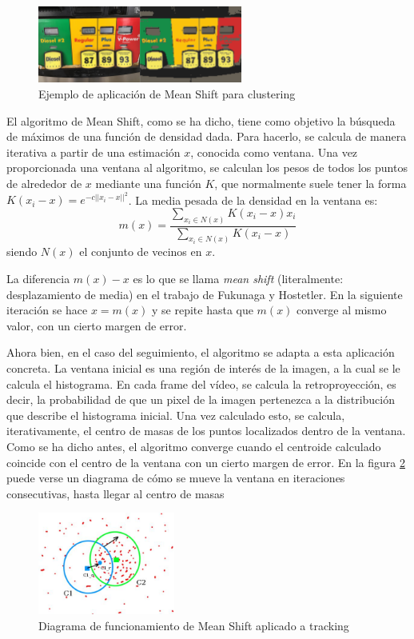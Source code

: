\begin{figure}
    \centering
    \includegraphics[width=0.6\textwidth]{images/clustering}
    \caption{Ejemplo de aplicación de Mean Shift para clustering}
    \label{fig:clustering}
\end{figure}

El algoritmo de Mean Shift, como se ha dicho, tiene como objetivo la búsqueda de máximos de una función de densidad dada. Para hacerlo, se calcula de manera iterativa a partir de una estimación $x$, conocida como ventana. Una vez proporcionada una ventana al algoritmo, se calculan los pesos de todos los puntos de alrededor de $x$ mediante una función $K$, que normalmente suele tener la forma $K(x_i-x) = e^{-c||x_i-x||^2}$. La media pesada de la densidad en la ventana es:
\[
  m(x) = \frac{\sum_{x_i\in N(x)}K(x_i-x)x_i}{\sum_{x_i\in N(x)}K(x_i-x)}
\]
siendo $N(x)$ el conjunto de vecinos en $x$.

La diferencia $m(x)-x$ es lo que se llama \textit{mean shift} (literalmente: desplazamiento de media) en el trabajo de Fukunaga y Hostetler. En la siguiente iteración se hace $x= m(x)$ y se repite hasta que $m(x)$ converge al mismo valor, con un cierto margen de error.

Ahora bien, en el caso del seguimiento, el algoritmo se adapta a esta aplicación concreta. La ventana inicial es una región de interés de la imagen, a la cual se le calcula el histograma. En cada frame del vídeo, se calcula la retroproyección, es decir, la probabilidad de que un pixel de la imagen pertenezca a la distribución que describe el histograma inicial. Una vez calculado esto, se calcula, iterativamente, el centro de masas de los puntos localizados dentro de la ventana. Como se ha dicho antes, el algoritmo converge cuando el centroide calculado coincide con el centro de la ventana con un cierto margen de error. En la figura \ref{fig:meanshiftopencv} puede verse un diagrama de cómo se mueve la ventana en iteraciones consecutivas, hasta llegar al centro de masas

\begin{figure}
    \centering
    \includegraphics[width=0.4\textwidth]{images/meanshiftopencv}
    \caption{Diagrama de funcionamiento de Mean Shift aplicado a tracking}
    \label{fig:meanshiftopencv}
\end{figure}


